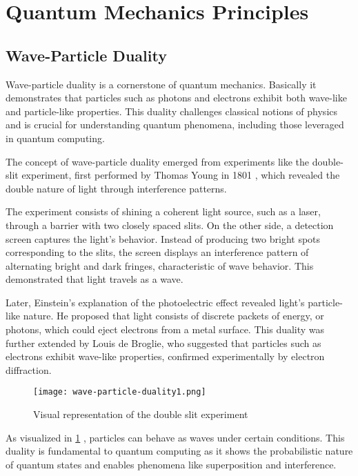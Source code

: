 \documentclass{report}
\begin{document}
\section{Quantum Mechanics Principles}

\subsection{Wave-Particle Duality}
Wave-particle duality is a cornerstone of quantum mechanics. Basically it demonstrates that particles such as photons and electrons exhibit both wave-like and particle-like properties. This duality challenges classical notions of physics and is crucial for understanding quantum phenomena, including those leveraged in quantum computing.

The concept of wave-particle duality emerged from experiments like the double-slit experiment, first performed by Thomas Young in 1801 \cite{imperialDoubleslitExperiment}, which revealed the double nature of light through interference patterns. 

The experiment consists of shining a coherent light source, such as a laser, through a barrier with two closely spaced slits. On the other side, a detection screen captures the light’s behavior. Instead of producing two bright spots corresponding to the slits, the screen displays an interference pattern of alternating bright and dark fringes, characteristic of wave behavior. This demonstrated that light travels as a wave.

Later, Einstein’s explanation of the photoelectric effect revealed light’s particle-like nature. He proposed that light consists of discrete packets of energy, or photons, which could eject electrons from a metal surface. This duality was further extended by Louis de Broglie, who suggested that particles such as electrons exhibit wave-like properties, confirmed experimentally by electron diffraction.

 

\begin{figure}
    \centering
    \texttt{[image: wave-particle-duality1.png]}
    \caption{Visual representation of the double slit experiment}
    \label{fig:double-slit}
\end{figure}

As visualized in \ref{fig:double-slit} , particles can behave as waves under certain conditions. This duality is fundamental to quantum computing as it shows the probabilistic nature of quantum states and enables phenomena like superposition and interference.
\end{document}
